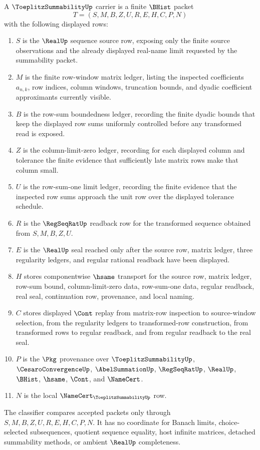 \begin{definition}\label{def:toeplitz-summability-carrier}
A $\ToeplitzSummabilityUp$ carrier is a finite $\BHist$ packet
$$
T=(S,M,B,Z,U,R,E,H,C,P,N)
$$
with the following displayed rows:
\begin{enumerate}
\item $S$ is the $\RealUp$ sequence source row, exposing only the finite source observations and the already displayed real-name limit requested by the summability packet.
\item $M$ is the finite row-window matrix ledger, listing the inspected coefficients $a_{n,k}$, row indices, column windows, truncation bounds, and dyadic coefficient approximants currently visible.
\item $B$ is the row-sum boundedness ledger, recording the finite dyadic bounds that keep the displayed row sums uniformly controlled before any transformed read is exposed.
\item $Z$ is the column-limit-zero ledger, recording for each displayed column and tolerance the finite evidence that sufficiently late matrix rows make that column small.
\item $U$ is the row-sum-one limit ledger, recording the finite evidence that the inspected row sums approach the unit row over the displayed tolerance schedule.
\item $R$ is the $\RegSeqRatUp$ readback row for the transformed sequence obtained from $S,M,B,Z,U$.
\item $E$ is the $\RealUp$ seal reached only after the source row, matrix ledger, three regularity ledgers, and regular rational readback have been displayed.
\item $H$ stores componentwise $\hsame$ transport for the source row, matrix ledger, row-sum bound, column-limit-zero data, row-sum-one data, regular readback, real seal, continuation row, provenance, and local naming.
\item $C$ stores displayed $\Cont$ replay from matrix-row inspection to source-window selection, from the regularity ledgers to transformed-row construction, from transformed rows to regular readback, and from regular readback to the real seal.
\item $P$ is the $\Pkg$ provenance over $\ToeplitzSummabilityUp$, $\CesaroConvergenceUp$, $\AbelSummationUp$, $\RegSeqRatUp$, $\RealUp$, $\BHist$, $\hsame$, $\Cont$, and $\NameCert$.
\item $N$ is the local $\NameCert_{\ToeplitzSummabilityUp}$ row.
\end{enumerate}
The classifier compares accepted packets only through $S,M,B,Z,U,R,E,H,C,P,N$. It has no coordinate for Banach limits, choice-selected subsequences, quotient sequence equality, host infinite matrices, detached summability methods, or ambient $\RealUp$ completeness.
\end{definition}

